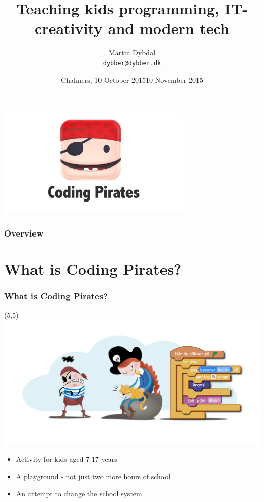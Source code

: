 \documentclass{beamer}
\title[APL \& TAIL] %
  {Teaching kids programming, IT-creativity and modern tech} %
\author{\footnotesize{Martin Dybdal} \\ \footnotesize{\texttt{dybber@dybber.dk}}}
\institute {
DIKU \\
University of Copenhagen
}
\date{\footnotesize{Chalmers, 10 October 2015}}
\date{10 November 2015}
\begin{document}
{
\begin{frame}
  \begin{center}
    \includegraphics[width=0.7\textwidth]{imagery/codingpirates.png}
  \end{center}
\vspace{-1cm}
\titlepage
\end{frame}
}


\begin{frame}
\frametitle{Overview}
\tableofcontents
\end{frame}


\section{What is Coding Pirates?}
\begin{frame}
\frametitle{What is Coding Pirates?}

\begin{textblock}{20}(5,5)
 \includegraphics[width=\textwidth]{imagery/cpthack-and-miss1337.png}
\end{textblock}

\begin{itemize}
\item Activity for kids aged 7-17 years
\item A playground - not just two more hours of school
\item An attempt to change the school system
\end{itemize}
\end{frame}
\end{document}
